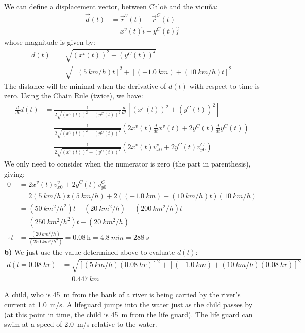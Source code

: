 \begin{solution}
We can define a displacement vector, between Chlo\"e and the vicu\~na:
\begin{align*}
\vec d(t) &=\vec r^v(t)-\vec r^C(t)\\
&=x^v(t)\hat i-y^C(t)\hat j
\end{align*}
whose magnitude is given by:
\begin{align*}
d(t)&=\sqrt{(x^v(t))^2+(y^C(t))^2}\\
&=\sqrt{[(\SI{5}{km/h})t]^2+[(\SI{-1.0}{km})+(\SI{10}{km/h})t]^2}
\end{align*}
The distance will be minimal when the derivative of $d(t)$ with respect to time is zero. Using the Chain Rule (twice), we have:
\begin{align*}
\frac{d}{dt}d(t)&=\frac{1}{2\sqrt{(x^v(t))^2+(y^C(t))^2}}\frac{d}{dt}\left[(x^v(t))^2+(y^C(t))^2\right]\\
&=\frac{1}{2\sqrt{(x^v(t))^2+(y^C(t))^2}}\left( 2x^v(t)\frac{d}{dt}x^v(t)+2y^C(t)\frac{d}{dt}y^C(t) \right)\\
&=\frac{1}{2\sqrt{(x^v(t))^2+(y^C(t))^2}}\left( 2x^v(t)v^v_{x0}+2y^C(t)v^C_{y0} \right)
\end{align*}
We only need to consider when the numerator is zero (the part in parenthesis), giving:
\begin{align*}
 0&=2x^v(t)v^v_{x0}+2y^C(t)v^C_{y0}\\
 &=2(\SI{5}{km/h})t(\SI{5}{km/h})+2((\SI{-1.0}{km})+(\SI{10}{km/h})t)(\SI{10}{km/h})\\
 &=(\SI{50}{km^2/h^2})t-(\SI{20}{km^2/h})+(\SI{200}{km^2/h})t\\
 &=(\SI{250}{km^2/h^2})t-(\SI{20}{km^2/h})\\
 \therefore t&=\frac{(\SI{20}{km^2/h})}{(\SI{250}{km^2/h^2})}=\SI{0.08}{\hour}=\SI{4.8}{min}=\SI{288}{s}
\end{align*}
\textbf{b)} We just use the value determined above to evaluate $d(t)$:
\begin{align*}
d(t=\SI{0.08}{hr})&=\sqrt{[(\SI{5}{km/h})(\SI{0.08}{hr})]^2+[(\SI{-1.0}{km})+(\SI{10}{km/h})(\SI{0.08}{hr})]^2}\\
&=\SI{0.447}{km}
\end{align*}
\end{solution}

\question A child, who is \SI{45}{m} from the bank of a river is being carried by the river's current at \SI{1.0}{m/s}. A lifeguard jumps into the water just as the child passes by (at this point in time, the child is \SI{45}{m} from the life guard). The life  guard can swim at a speed of \SI{2.0}{m/s} relative to the water. 

